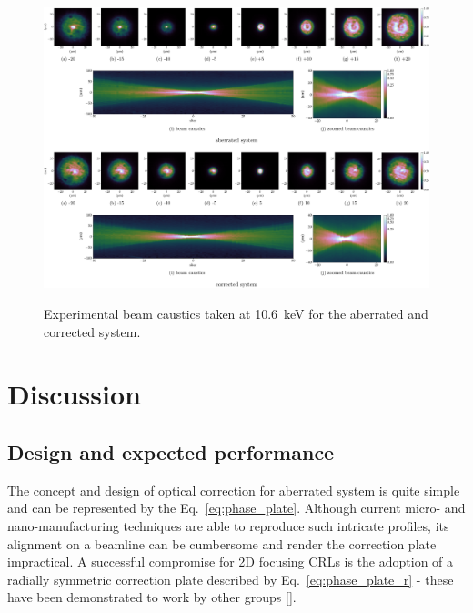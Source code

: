 \begin{refsection}
\begin{figure}[t]
        \centering
        {\includegraphics[width=1.0\linewidth]{figures/ch06/experimental_CDn_pp.pdf}}
        \caption[Experimental beam caustics for the aberrated and corrected systems]{Experimental beam caustics taken at 10.6~keV for the aberrated and corrected system.}\label{fig:experimental_CDn_pp}
\end{figure}
\section{Discussion}\label{sec:corrective_optics_discussion}

\subsection{Design and expected performance}

The concept and design of optical correction for aberrated system is quite simple and can be represented by the Eq.~\ref{eq:phase_plate}. Although current micro- and nano-manufacturing techniques are able to reproduce such intricate profiles, its alignment on a beamline can be cumbersome and render the correction plate impractical. A successful compromise for 2D focusing CRLs is the adoption of a radially symmetric correction plate described by Eq.~\ref{eq:phase_plate_r} - these have been demonstrated to work by other groups [\cite{Seiboth2017,Seiboth2018,Seiboth2020,Dhamgaye2020}]. 


\end{refsection}
